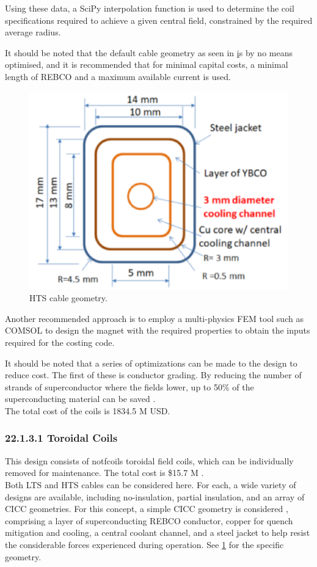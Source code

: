 Using these data, a SciPy interpolation function is used to determine the coil specifications required to achieve a given central field, constrained by the required average radius.

It should be noted that the default cable geometry as seen in \href{fig:yuhu_cs} is by no means optimised, and it is recommended that for minimal capital costs, a minimal length of REBCO and a maximum available current is used.


\begin{figure}[h]
    \centering
    \includegraphics[width =0.5\linewidth]{StandardFigures/yuhu_cs.pdf}
    \caption{HTS cable geometry.}
    \label{fig:yuhu_cs}
\end{figure}

Another recommended approach is to employ a multi-physics FEM tool such as COMSOL to design the magnet with the required properties to obtain the inputs required for the costing code.

It should be noted that a series of optimizations can be made to the design to reduce cost. The first of these is conductor grading. By reducing the number of strands of superconductor where the fields lower, up to 50\% of the superconducting material can be saved \cite{uglietti2018progressing}.\\

The total cost of the coils is 1834.5 M USD.


\subsubsection*{22.1.3.1 Toroidal Coils}

This design consists of notfcoils toroidal field coils, which can be individually removed for maintenance. The total cost is \$15.7 M .\\

Both LTS and HTS cables can be considered here. For each, a wide variety of designs are available, including no-insulation, partial insulation, and an array of CICC geometries. For this concept, a simple CICC geometry is considered \cite{Menard2016}, comprising a layer of superconducting REBCO conductor, copper for quench mitigation and cooling, a central coolant channel, and a steel jacket to help resist the considerable forces experienced during operation. See \ref{fig:yuhu_cs} for the specific geometry.\\

